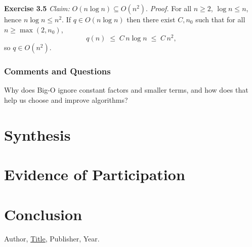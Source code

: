 \documentclass{article}
\theoremstyle{theorem}
\theoremstyle{definition}
\theoremstyle{remark}
\begin{document}
\textbf{Exercise 3.5}  
\emph{Claim:} $O(n\log n)\subseteq O(n^2)$.  
\noindent\emph{Proof.}  
For all $n\ge2$, $\log n\le n$, hence $n\log n\le n^2$. If $q\in O(n\log n)$ then there exist $C,n_0$ such that for all $n\ge\max(2,n_0)$,
\[
  q(n)\;\le\;C\,n\log n\;\le\;C\,n^2,
\]
so $q\in O(n^2)$.


\subsubsection*{Comments and Questions}

Why does Big-O ignore constant factors and smaller terms, and how does that help us choose and improve algorithms?

\section{Synthesis}

\section{Evidence of Participation}

\section{Conclusion}\label{conclusion}

\begin{thebibliography}{99}
 Author, \href{https://en.wikipedia.org/wiki/LaTeX}{Title}, Publisher, Year.
\end{thebibliography}
\end{document}
